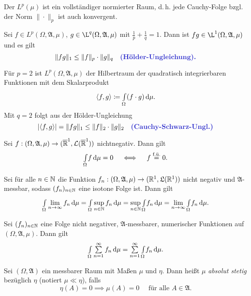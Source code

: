 \documentclass{cheat-sheet}
\newcommand{\Alg}{\mathfrak{A}} %
\newcommand{\LebAlg}{\mathfrak{L}} %
\newcommand{\fue}{\overset{\text{f.ü.}}} %
\newcommand{\IntOmu}[1]{\Int{\Omega}{}{#1}{\mu}} %
\begin{document}
\begin{satz}
  Der $L^p(\mu)$ ist ein vollständiger normierter Raum, d.\,h. jede Cauchy-Folge bzgl. der Norm $\| \cdot \|_p$ ist auch konvergent.
\end{satz}

\begin{satz}
  Sei $f \in L^p(\Omega, \Alg, \mu)$, $g \in \L^q(\Omega, \Alg, \mu)$ mit $\tfrac{1}{p} + \tfrac{1}{q} = 1$. Dann ist $fg \in \L^1(\Omega, \Alg, \mu)$ und es gilt
  \[ \norm{fg}_1 \leq \norm{f}_p \cdot \norm{g}_q \quad \text{\emph{(Hölder-Ungleichung).}} \]
\end{satz}

\begin{bem}
  Für $p = 2$ ist $L^p(\Omega, \Alg, \mu)$ der Hilbertraum der quadratisch integrierbaren Funktionen mit dem Skalarprodukt
  \[ \langle f , g \rangle \coloneqq \IntOmu{(f \cdot g)}. \]
  Mit $q = 2$ folgt aus der Hölder-Ungleichung
  \[ \abs{\langle f , g \rangle} = \norm{fg}_1 \leq \norm{f}_2 \cdot \norm{g}_2 \quad \text{\emph{(Cauchy-Schwarz-Ungl.)}} \]
\end{bem}

\begin{satz}
  Sei $f : (\Omega, \Alg, \mu) \to (\ER^1, \mathcal{L}(\ER^1))$ nichtnegativ. Dann gilt
  \[ \IntOmu{f} = 0 \quad \iff \quad f \fue{=} 0. \]
\end{satz}



\begin{satz}
  Sei für alle $n \in \mathbb{N}$ die Funktion $f_n : (\Omega, \Alg, \mu) \to (\R^1, \LebAlg(\R^1))$ nicht negativ und $\Alg$-messbar, sodass $(f_n)_{n \in \mathbb{N}}$ eine isotone Folge ist. Dann gilt
  \[ \IntOmu{\lim_{n \to \infty} f_n} = \IntOmu{\sup_{n \in \N} f_n} = \sup_{n \in \N} \IntOmu{f_n} = \lim_{n \to \infty} \IntOmu{f_n}. \]
\end{satz}

\begin{kor}
  Sei $(f_n)_{n \in \mathbb{N}}$ eine Folge nicht negativer, $\Alg$-messbarer, numerischer Funktionen auf $(\Omega, \Alg, \mu)$. Dann gilt
  \[ \IntOmu{\sum_{n=1}^{\infty} f_n} = \sum_{n=1}^\infty \IntOmu{f_n}. \]
\end{kor}

\begin{defn}
  Sei $(\Omega, \Alg)$ ein messbarer Raum mit Maßen $\mu$ und $\eta$. Dann heißt $\mu$ \emph{absolut stetig} bezüglich $\eta$ (notiert $\mu \ll \eta$), falls
  \[ \eta(A) = 0 \implies \mu(A) = 0 \quad \text{ für alle } A \in \Alg. \]
\end{defn}
\end{document}
